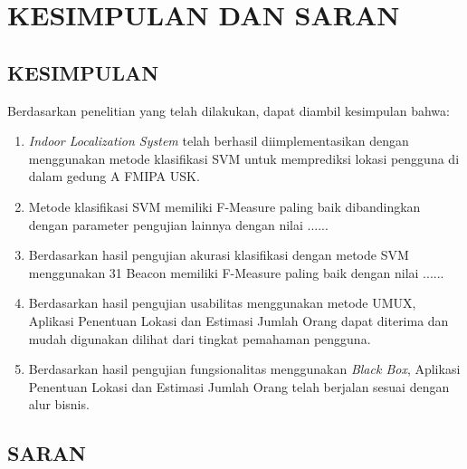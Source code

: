 \fancyhf{}
\fancyfoot[C]{\thepage}
\chapter{KESIMPULAN DAN SARAN}

\section{\uppercase{KESIMPULAN}}
Berdasarkan penelitian yang telah dilakukan, dapat diambil kesimpulan bahwa:
\begin{enumerate}
	\item \textit{Indoor Localization System} telah berhasil diimplementasikan dengan menggunakan metode klasifikasi SVM untuk memprediksi lokasi pengguna di dalam gedung A FMIPA USK.
	\item Metode klasifikasi SVM memiliki F-Measure paling
	      baik dibandingkan dengan parameter pengujian lainnya dengan nilai ......
	\item Berdasarkan hasil pengujian akurasi klasifikasi dengan metode SVM menggunakan 31 Beacon memiliki F-Measure paling baik dengan nilai  ......
	\item Berdasarkan hasil pengujian usabilitas menggunakan metode UMUX, Aplikasi Penentuan Lokasi dan Estimasi Jumlah Orang dapat diterima dan mudah digunakan dilihat dari tingkat pemahaman pengguna.
	\item Berdasarkan hasil pengujian fungsionalitas menggunakan \textit{Black Box}, Aplikasi Penentuan Lokasi dan Estimasi Jumlah Orang telah berjalan sesuai dengan alur bisnis.
\end{enumerate}



\section{\uppercase{SARAN}}

